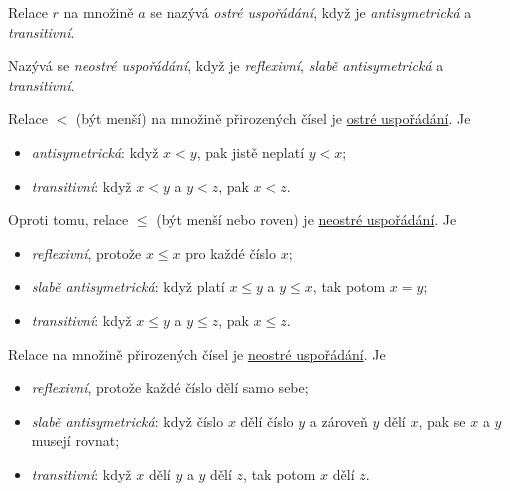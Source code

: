 \begin{definition}[Uspořádání]
  \label{def:usporadani}
  Relace $r$ na množině $a$ se nazývá \emph{ostré uspořádání}, když je
  \emph{antisymetrická} a \emph{transitivní}.

  Nazývá se \emph{neostré uspořádání}, když je \emph{reflexivní}, \emph{slabě
  antisymetrická} a \emph{transitivní}.
\end{definition}
\begin{example}
  \label{exam:usporadani}
  Relace $<$ (být menší) na množině přirozených čísel je
  \hyperref[def:usporadani]{ostré uspořádání}. Je
  \begin{itemize}
    \item \emph{antisymetrická}: když $x < y$, pak jistě neplatí $y < x$;
    \item \emph{transitivní}: když $x < y$ a $y < z$, pak $x < z$.
  \end{itemize}
  Oproti tomu, relace $ \leq $ (být menší nebo roven) je
  \hyperref[def:usporadani]{neostré uspořádání}. Je
  \begin{itemize}
    \item \emph{reflexivní}, protože $x \leq x$ pro každé číslo $x$;
    \item \emph{slabě antisymetrická}: když platí $x \leq y$ a $y \leq x$, tak
      potom $x = y$;
    \item \emph{transitivní}: když $x \leq y$ a $y \leq z$, pak $x \leq z$.
  \end{itemize}
\end{example}
\begin{example}
  \label{exam:usporadani-delitelnosti}
  Relace  na množině přirozených čísel je
  \hyperref[def:usporadani]{neostré uspořádání}. Je
  \begin{itemize}
    \item \emph{reflexivní}, protože každé číslo dělí samo sebe;
    \item \emph{slabě antisymetrická}: když číslo $x$ dělí číslo $y$ a zároveň
      $y$ dělí $x$, pak se $x$ a $y$ musejí rovnat;
    \item \emph{transitivní}: když $x$ dělí $y$ a $y$ dělí $z$, tak potom $x$
      dělí $z$.
  \end{itemize}
\end{example}

